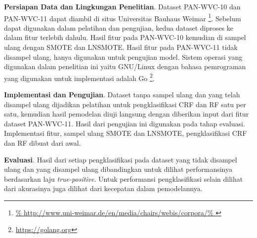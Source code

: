 \textbf{Persiapan Data dan Lingkungan Penelitian}.
Dataset PAN-WVC-10 dan PAN-WVC-11 dapat diambil di situs Universitas Bauhaus
Weimar
\footnote{%
	\RaggedRight\url{%
	http://www.uni-weimar.de/en/media/chairs/webis/corpora/%
}}.
Sebelum dapat digunakan dalam pelatihan dan pengujian, kedua dataset diproses
ke dalam fitur terlebih dahulu.
Hasil fitur pada PAN-WVC-10 kemudian di sampel ulang dengan SMOTE dan LNSMOTE.
Hasil fitur pada PAN-WVC-11 tidak disampel ulang, hanya digunakan untuk
pengujian model.
Sistem operasi yang digunakan dalam penelitian ini yaitu GNU/Linux dengan
bahasa pemrograman yang digunakan untuk implementasi adalah Go
\footnote{\RaggedRight\url{https://golang.org}}.

\textbf{Implementasi dan Pengujian}.
Dataset tanpa sampel ulang dan yang telah disampel ulang dijadikan
pelatihan untuk pengklasifikasi CRF dan RF satu per satu, kemudian hasil
pemodelan diuji langsung dengan diberikan input dari fitur dataset PAN-WVC-11.
Hasil dari pengujian ini digunakan pada tahap evaluasi.
Implementasi fitur, sampel ulang SMOTE dan LNSMOTE, pengklasifikasi CRF dan RF
dibuat dari awal.

\textbf{Evaluasi}.
Hasil dari setiap pengklasifikasi pada dataset yang tidak disampel ulang dan
yang disampel ulang dibandingkan untuk dilihat performansinya berdasarkan laju
\textit{true-positive}.
Untuk performansi pengklasifikasi selain dilihat dari akurasinya juga dilihat
dari kecepatan dalam pemodelannya.

